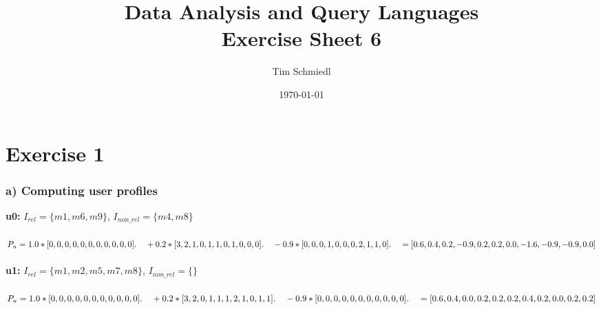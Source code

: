 \documentclass{article}
\begin{document}
\title{Data Analysis and Query Languages \\
 Exercise Sheet 6}
\date{\today}
\author{Tim Schmiedl} 
\maketitle


\section*{Exercise 1}
\subsubsection*{a) Computing user profiles}
\textbf{u0:} $I_{rel}=\{m1,m6,m9\}$, $I_{non\_rel}=\{m4,m8\}$\\
\\
$P_u=1.0*[0, 0, 0, 0, 0, 0, 0, 0, 0, 0, 0]\\
. \;\;\;\: + 0.2*[3, 2, 1, 0, 1, 1, 0, 1, 0, 0, 0]\\
. \;\;\;\: - 0.9*[0, 0, 0, 1, 0, 0, 0, 2, 1, 1, 0]\\
\\
. \;\;\;\: =[0.6, 0.4, 0.2, -0.9, 0.2, 0.2, 0.0, -1.6, -0.9, -0.9, 0.0]$\\
\vspace{1.5cm}
\\
\textbf{u1:} $I_{rel}=\{m1,m2,m5,m7,m8\}$, $I_{non\_rel}=\{\}$\\
\\
$P_u=1.0*[0, 0, 0, 0, 0, 0, 0, 0, 0, 0, 0]\\
. \;\;\;\: +0.2*[3, 2, 0, 1, 1, 1, 2, 1, 0, 1, 1]\\
. \;\;\;\: -0.9*[0, 0, 0, 0, 0, 0, 0, 0, 0, 0, 0]\\
\\
. \;\;\;\: =[0.6, 0.4, 0.0, 0.2, 0.2, 0.2, 0.4, 0.2, 0.0, 0.2, 0.2]$\\
\\
\vspace{3cm}
\end{document}
